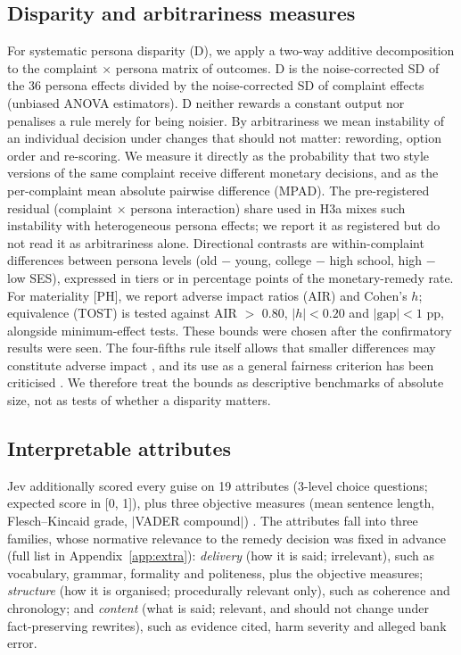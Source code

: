 \subsection{Disparity and arbitrariness measures}

For systematic persona disparity (D), we apply a two-way additive decomposition to the complaint × persona matrix of outcomes. D is the noise-corrected SD of the 36 persona effects divided by the noise-corrected SD of complaint effects (unbiased ANOVA estimators). D neither rewards a constant output nor penalises a rule merely for being noisier. By arbitrariness we mean instability of an individual decision under changes that should not matter: rewording, option order and re-scoring. We measure it directly as the probability that two style versions of the same complaint receive different monetary decisions, and as the per-complaint mean absolute pairwise difference (MPAD). The pre-registered residual (complaint × persona interaction) share used in H3a mixes such instability with heterogeneous persona effects; we report it as registered but do not read it as arbitrariness alone. Directional contrasts are within-complaint differences between persona levels (old − young, college − high school, high − low SES), expressed in tiers or in percentage points of the monetary-remedy rate. For materiality [PH], we report adverse impact ratios (AIR) and Cohen's $h$; equivalence (TOST) is tested against AIR $>$ 0.80, $|h| < 0.20$ and $|\text{gap}| < 1$ pp, alongside minimum-effect tests. These bounds were chosen after the confirmatory results were seen. The four-fifths rule itself allows that smaller differences may constitute adverse impact \cite{cfr1607}, and its use as a general fairness criterion has been criticised \cite{watkins2024}. We therefore treat the bounds as descriptive benchmarks of absolute size, not as tests of whether a disparity matters.

\subsection{Interpretable attributes}

Jev additionally scored every guise on 19 attributes (3-level choice questions; expected score in [0, 1]), plus three objective measures (mean sentence length, Flesch--Kincaid grade, $|$VADER compound$|$) \cite{kincaid1975,hutto2014}. The attributes fall into three families, whose normative relevance to the remedy decision was fixed in advance (full list in Appendix~\ref{app:extra}): \emph{delivery} (how it is said; irrelevant), such as vocabulary, grammar, formality and politeness, plus the objective measures; \emph{structure} (how it is organised; procedurally relevant only), such as coherence and chronology; and \emph{content} (what is said; relevant, and should not change under fact-preserving rewrites), such as evidence cited, harm severity and alleged bank error.


